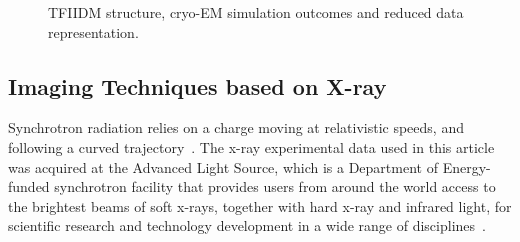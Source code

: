 \begin{figure}[!t]
\centering
{}
\hfil
{}
\caption{TFIIDM structure, cryo-EM simulation outcomes and reduced data representation.}
\label{fig:ldrd}
\end{figure}

\subsection{Imaging Techniques based on X-ray}


Synchrotron radiation relies on a charge moving at relativistic speeds, and following a curved trajectory~\cite{url:als:booklet}. The x-ray experimental data used in this article was acquired at the Advanced Light Source, which is a Department of Energy-funded synchrotron facility that provides users from around the world access to the brightest beams of soft x-rays, together with hard x-ray and infrared light, for scientific research and technology development in a wide range of disciplines~\cite{url:als}.

